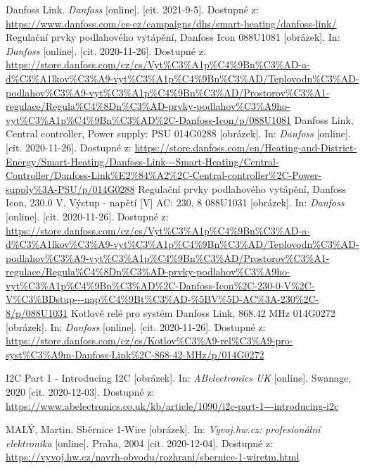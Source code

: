 \begin{thebibliography}{3}
Danfoss Link. \textit{Danfoss} [online]. [cit. 2021-9-5]. Dostupné z: \url{https://www.danfoss.com/cs-cz/campaigns/dhs/smart-heating/danfoss-link/}
Regulační prvky podlahového vytápění, Danfoss Icon 088U1081 [obrázek]. In: \textit{Danfoss} [online]. [cit. 2020-11-26]. Dostupné z: \url{https://store.danfoss.com/cz/cs/Vyt\%C3\%A1p\%C4\%9Bn\%C3\%AD-a-d\%C3\%A1lkov\%C3\%A9-vyt\%C3\%A1p\%C4\%9Bn\%C3\%AD/Teplovodn\%C3\%AD-podlahov\%C3\%A9-vyt\%C3\%A1p\%C4\%9Bn\%C3\%AD/Prostorov\%C3\%A1-regulace/Regula\%C4\%8Dn\%C3\%AD-prvky-podlahov\%C3\%A9ho-vyt\%C3\%A1p\%C4\%9Bn\%C3\%AD\%2C-Danfoss-Icon/p/088U1081}
Danfoss Link, Central controller, Power supply: PSU 014G0288 [obrázek]. In: \textit{Danfoss} [online]. [cit. 2020-11-26]. Dostupné z: \url{https://store.danfoss.com/en/Heating-and-District-Energy/Smart-Heating/Danfoss-Link---Smart-Heating/Central-Controller/Danfoss-Link\%E2\%84\%A2\%2C-Central-controller\%2C-Power-supply\%3A-PSU/p/014G0288}
Regulační prvky podlahového vytápění, Danfoss Icon, 230.0 V, Výstup - napětí [V] AC: 230, 8 088U1031 [obrázek]. In: \textit{Danfoss} [online]. [cit. 2020-11-26]. Dostupné z: \url{https://store.danfoss.com/cz/cs/Vyt\%C3\%A1p\%C4\%9Bn\%C3\%AD-a-d\%C3\%A1lkov\%C3\%A9-vyt\%C3\%A1p\%C4\%9Bn\%C3\%AD/Teplovodn\%C3\%AD-podlahov\%C3\%A9-vyt\%C3\%A1p\%C4\%9Bn\%C3\%AD/Prostorov\%C3\%A1-regulace/Regula\%C4\%8Dn\%C3\%AD-prvky-podlahov\%C3\%A9ho-vyt\%C3\%A1p\%C4\%9Bn\%C3\%AD\%2C-Danfoss-Icon\%2C-230-0-V\%2C-V\%C3\%BDstup---nap\%C4\%9Bt\%C3\%AD-\%5BV\%5D-AC\%3A-230\%2C-8/p/088U1031}
Kotlové relé pro systém Danfoss Link, 868.42 MHz 014G0272 [obrázek]. In: \textit{Danfoss} [online]. [cit. 2020-11-26]. Dostupné z: \url{https://store.danfoss.com/cz/cs/Kotlov\%C3\%A9-rel\%C3\%A9-pro-syst\%C3\%A9m-Danfoss-Link\%2C-868-42-MHz/p/014G0272}

I2C Part 1 - Introducing I2C [obrázek]. In: \textit{ABelectronics UK} [online]. Swanage, 2020 [cit. 2020-12-03]. Dostupné z: \url{https://www.abelectronics.co.uk/kb/article/1090/i2c-part-1---introducing-i2c}

MALÝ, Martin. Sběrnice 1-Wire [obrázek]. In: \textit{Vyvoj.hw.cz: profesionální elektronika} [online]. Praha, 2004 [cit. 2020-12-04]. Dostupné z: \url{https://vyvoj.hw.cz/navrh-obvodu/rozhrani/sbernice-1-wiretm.html}


\end{thebibliography}
